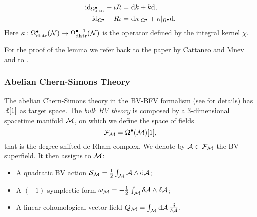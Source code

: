 \begin{lemma}
\begin{enumerate}[label={\normalfont \alph*)}]
\begin{itemize}[label= $\diamond$]
\begin{equation}
\begin{aligned}
                    {\normalfont \text{id}}_{\Omega^\bullet_{\text{\normalfont distr}}} - \iota R =& \; \dd k + k \dd , \\
                    {\normalfont \text{id}}_{\Omega^\bullet} - R \iota =& \; \dd \kappa|_{\Omega^\bullet} + \kappa|_{\Omega^\bullet} \dd .
                \end{aligned}
            \end{equation}
            Here $\kappa: \Omega_{\text{\normalfont distr}}^{\bullet} (\mathcal{N}) \rightarrow \Omega_{\text{\normalfont distr}}^{\bullet - 1} (\mathcal{N})$ is the operator defined by the integral kernel $\chi$.
        \end{itemize}
    \end{enumerate}
\end{lemma}

For the proof of the lemma we refer back to the paper by Cattaneo and Mnev and to \cite{Proof_second_lemma}.

\subsubsection{Abelian Chern-Simons Theory}
\label{subsubsec:abelian_chern_simons_theory}

The abelian Chern-Simons theory in the BV-BFV formalism (see \cite{Mnfd_boundaries} for details) has $\mathbb{R}[1]$ as target space.
The \emph{bulk BV theory} is composed by a 3-dimensional spacetime manifold $\mathcal{M}$, on which we define the space of fields
\begin{equation*}
    \mathcal{F}_{\mathcal{M}} = \Omega^\bullet (\mathcal{M})[1],
\end{equation*}
that is the degree shifted de Rham complex.
We denote by $\mathcal{A} \in \mathcal{F}_{\mathcal{M}}$ the BV superfield.
It then assigns to $\mathcal{M}$:
\begin{itemize}
    \item A quadratic BV action $\mathcal{S}_{\mathcal{M}} = \frac{1}{2}\int_{\mathcal{M}} \mathcal{A} \wedge \dd \mathcal{A}$;
    \item A $(-1)$-symplectic form $\omega_{\mathcal{M}} = - \frac{1}{2} \int_{\mathcal{M}} \delta \mathcal{A} \wedge \delta \mathcal{A}$;
    \item A linear cohomological vector field $Q_{\mathcal{M}} = \int_{\mathcal{M}} \dd \mathcal{A} \: \frac{\delta}{\delta \mathcal{A}}$.
\end{itemize}

